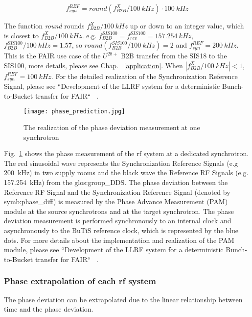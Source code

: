 \begin{equation}
\label{round}
	f_\mathit{syn}^\mathit{REF}=\textit{round} (f_\mathit{B2B}^{X}/\SI{100}{kHz})\cdot \SI{100}{kHz}
\end{equation}

The function \textit{round} rounds $f_\mathit{B2B}^{X}/\SI{100}{kHz}$ up or down to an integer value, which is closest to $f_\mathit{B2B}^{X}/\SI{100}{kHz}$. e.g. $f_\mathit{B2B}^{SIS100}=f_\mathit{rev}^{SIS100}=\SI{157.254}{kHz}$, $f_\mathit{B2B}^{SIS100}/\SI{100}{kHz}=1.57$, so $\textit{round} (f_\mathit{B2B}^{SIS100}/\SI{100}{kHz})=2$ and $f_\mathit{syn}^\mathit{REF}=\SI{200}{kHz}$. This is the FAIR use case of the $U^{28+}$ B2B transfer from the SIS18 to the SIS100, more details, please see Chap. ~\ref{application}. When $|f_\mathit{B2B}^{X}/\SI{100}{kHz}|<1$, $f_\mathit{syn}^\mathit{REF}=\SI{100}{kHz}$.  For the detailed realization of the Synchronization Reference Signal, please see ``Development of the LLRF system for a deterministic Bunch-to-Bucket transfer for FAIR`` ~\cite{ferrand_development_????}.

\begin{figure}[!htb]
   \centering   
   \texttt{[image: phase\_prediction.jpg]}
   \caption{The realization of the phase deviation measurement at one synchrotron}
   \label{phase_prediction}
\end{figure}

Fig.~\ref{phase_prediction} shows the phase measurement of the rf system at a dedicated synchrotron. The red sinusoidal wave represents the Synchronization Reference Signals (e.g \SI{200}{kHz}) in two supply rooms and the black wave the Reference RF Signals (e.g. \SI{157.254}{kHz}) from the \gls{glos:group_DDS}. The phase deviation between the Reference RF Signal and the Synchronization Reference Signal (denoted by \gls{symb:phase_diff}) is measured by the Phase Advance Measurement (\gls{PAM}) module at the source synchrotrons and at the target synchrotron. The phase deviation measurement is performed synchronously to an internal clock and asynchronously to the BuTiS reference clock, which is represented by the blue dots. For more details about the implementation and realization of the PAM module, please see ``Development of the LLRF system for a deterministic Bunch-to-Bucket transfer for FAIR`` ~\cite{ferrand_development_????}. 
\subsubsection{Phase extrapolation of each rf system}
The phase deviation can be extrapolated due to the linear relationship between time and the phase deviation. 

